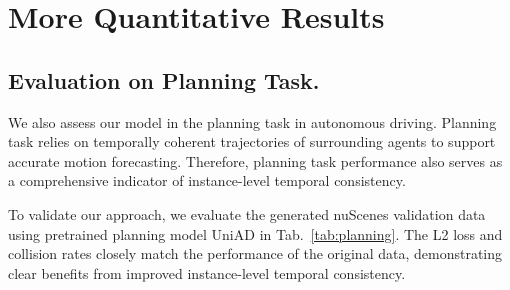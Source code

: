 \section{More Quantitative Results}



\subsection{Evaluation on Planning Task.} 
\label{app:planning}
We also assess our model in the planning task in autonomous driving.
Planning task \cite{hu2023planningorientedautonomousdriving} relies on temporally coherent trajectories of surrounding agents to support accurate motion forecasting. 
Therefore, planning task performance also serves as a comprehensive indicator of instance-level temporal consistency. 

To validate our approach, we evaluate the generated nuScenes validation data using pretrained planning model UniAD \cite{shi2016uniad} in Tab.~\ref{tab:planning}.
The L2 loss and collision rates closely match the performance of the original data, demonstrating clear benefits from improved instance-level temporal consistency.










\begin{table}[tb]
    \centering
    \footnotesize
    \caption{Comparison on planning task using the pre-trained planning model UniAD \cite{shi2016uniad}. 
    The L2 loss and collision rates closely match the performance of the original data, highlighting the benefits of enhanced temporal consistency.
    }
    \label{tab:planning}
\end{table}












